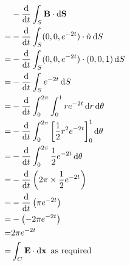 \documentclass[10pt,\jkfside,a4paper]{article}
\begin{document}
\begin{enumerate}
\begin{equation}
\begin{split}
 & -\dv{t}\int_S \mathbf{B} \cdot \dd{\mathbf{S}} \\
=& -\dv{t}\int_S (0, 0, e^{-2t}) \cdot \hat{n} \dd{S} \\
=& -\dv{t}\int_S (0, 0, e^{-2t}) \cdot (0, 0, 1) \dd{S} \\
=& -\dv{t}\int_S e^{-2t} \dd{S} \\
=& -\dv{t}\int^{2\pi}_0\int^1_0 re^{-2t} \dd{r}\dd{\theta} \\
=& -\dv{t}\int^{2\pi}_0\left[\frac{1}{2}r^2e^{-2t}\right]^1_0\dd{\theta} \\
=& -\dv{t}\int^{2\pi}_0 \frac{1}{2}e^{-2t} \dd{\theta} \\
=& -\dv{t} \left(2\pi \times \frac{1}{2}e^{-2t}\right) \\
=& -\dv{t} \left(\pi e^{-2t}\right) \\
=& -\left(-2\pi e^{-2t}\right) \\
=& 2\pi e^{-2t} \\
=& \int_C \mathbf{E} \cdot \dd{\mathbf{x}} \text{ as required } \\
\end{split}
\end{equation}

\end{enumerate}
\end{document}
